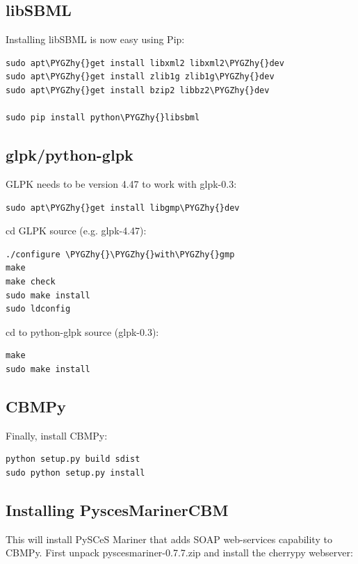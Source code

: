 \documentclass[a4paper,11pt,english]{sphinxmanual}
\def\PYGZhy{\char`\-}
\begin{document}
\subsection{libSBML}
\label{install_doc:libsbml}
Installing libSBML is now easy using Pip:

\begin{Verbatim}[commandchars=\\\{\}]
sudo apt\PYGZhy{}get install libxml2 libxml2\PYGZhy{}dev
sudo apt\PYGZhy{}get install zlib1g zlib1g\PYGZhy{}dev
sudo apt\PYGZhy{}get install bzip2 libbz2\PYGZhy{}dev

sudo pip install python\PYGZhy{}libsbml
\end{Verbatim}


\subsection{glpk/python-glpk}
\label{install_doc:glpk-python-glpk}
GLPK needs to be version 4.47 to work with glpk-0.3:

\begin{Verbatim}[commandchars=\\\{\}]
sudo apt\PYGZhy{}get install libgmp\PYGZhy{}dev
\end{Verbatim}

cd GLPK source (e.g. glpk-4.47):

\begin{Verbatim}[commandchars=\\\{\}]
./configure \PYGZhy{}\PYGZhy{}with\PYGZhy{}gmp
make
make check
sudo make install
sudo ldconfig
\end{Verbatim}

cd to python-glpk source (glpk-0.3):

\begin{Verbatim}[commandchars=\\\{\}]
make
sudo make install
\end{Verbatim}


\subsection{CBMPy}
\label{install_doc:cbmpy}
Finally, install CBMPy:

\begin{Verbatim}[commandchars=\\\{\}]
python setup.py build sdist
sudo python setup.py install
\end{Verbatim}


\subsection{Installing PyscesMarinerCBM}
\label{install_doc:installing-pyscesmarinercbm}
This will install PySCeS Mariner that adds SOAP web-services
capability to CBMPy. First unpack pyscesmariner-0.7.7.zip and install
the cherrypy webserver:
\end{document}
